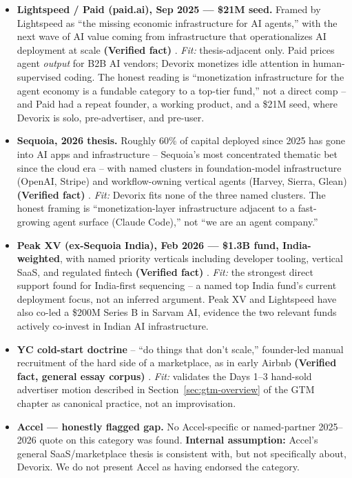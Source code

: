 \begin{itemize}
  \item \textbf{Lightspeed / Paid (paid.ai), Sep 2025 --- \$21M seed.} Framed by Lightspeed as ``the missing economic infrastructure for AI agents,'' with the next wave of AI value coming from infrastructure that operationalizes AI deployment at scale \textbf{(Verified fact)} \cite{paidai_2025}. \textit{Fit:} thesis-adjacent only. Paid prices agent \emph{output} for B2B AI vendors; Devorix monetizes idle attention in human-supervised coding. The honest reading is ``monetization infrastructure for the agent economy is a fundable category to a top-tier fund,'' not a direct comp -- and Paid had a repeat founder, a working product, and a \$21M seed, where Devorix is solo, pre-advertiser, and pre-user.
  \item \textbf{Sequoia, 2026 thesis.} Roughly 60\% of capital deployed since 2025 has gone into AI apps and infrastructure -- Sequoia's most concentrated thematic bet since the cloud era -- with named clusters in foundation-model infrastructure (OpenAI, Stripe) and workflow-owning vertical agents (Harvey, Sierra, Glean) \textbf{(Verified fact)} \cite{sequoia_2026}. \textit{Fit:} Devorix fits none of the three named clusters. The honest framing is ``monetization-layer infrastructure adjacent to a fast-growing agent surface (Claude Code),'' not ``we are an agent company.''
  \item \textbf{Peak XV (ex-Sequoia India), Feb 2026 --- \$1.3B fund, India-weighted}, with named priority verticals including developer tooling, vertical SaaS, and regulated fintech \textbf{(Verified fact)} \cite{peakxv_2026}. \textit{Fit:} the strongest direct support found for India-first sequencing -- a named top India fund's current deployment focus, not an inferred argument. Peak XV and Lightspeed have also co-led a \$200M Series B in Sarvam AI, evidence the two relevant funds actively co-invest in Indian AI infrastructure.
  \item \textbf{YC cold-start doctrine} -- ``do things that don't scale,'' founder-led manual recruitment of the hard side of a marketplace, as in early Airbnb \textbf{(Verified fact, general essay corpus)} \cite{ycombinator_coldstart}. \textit{Fit:} validates the Days 1--3 hand-sold advertiser motion described in Section~\ref{sec:gtm-overview} of the GTM chapter as canonical practice, not an improvisation.
  \item \textbf{Accel --- honestly flagged gap.} No Accel-specific or named-partner 2025--2026 quote on this category was found. \textbf{Internal assumption:} Accel's general SaaS/marketplace thesis is consistent with, but not specifically about, Devorix. We do not present Accel as having endorsed the category.
\end{itemize}

